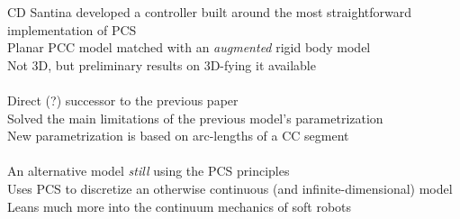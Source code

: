 CD Santina developed a controller built around the most straightforward implementation of PCS\\
Planar PCC model matched with an \textit{augmented} rigid body model\\
Not 3D, but preliminary results on 3D-fying it available\\
\\
Direct (?) successor to the previous paper\\
Solved the main limitations of the previous model's parametrization\\
New parametrization is based on arc-lengths of a CC segment\\
\\
An alternative model \textit{still} using the PCS principles\\
Uses PCS to discretize an otherwise continuous (and infinite-dimensional) model\\
Leans much more into the continuum mechanics of soft robots